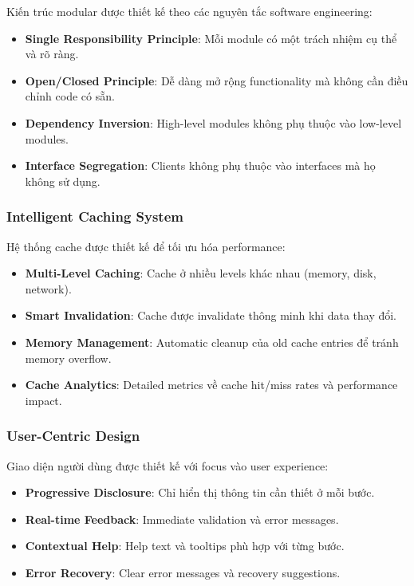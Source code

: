 Kiến trúc modular được thiết kế theo các nguyên tắc software engineering:

\begin{itemize}
    \item \textbf{Single Responsibility Principle}: Mỗi module có một trách nhiệm cụ thể và rõ ràng.
    \item \textbf{Open/Closed Principle}: Dễ dàng mở rộng functionality mà không cần điều chỉnh code có sẵn.
    \item \textbf{Dependency Inversion}: High-level modules không phụ thuộc vào low-level modules.
    \item \textbf{Interface Segregation}: Clients không phụ thuộc vào interfaces mà họ không sử dụng.
\end{itemize}

\subsubsection{Intelligent Caching System}

Hệ thống cache được thiết kế để tối ưu hóa performance:

\begin{itemize}
    \item \textbf{Multi-Level Caching}: Cache ở nhiều levels khác nhau (memory, disk, network).
    \item \textbf{Smart Invalidation}: Cache được invalidate thông minh khi data thay đổi.
    \item \textbf{Memory Management}: Automatic cleanup của old cache entries để tránh memory overflow.
    \item \textbf{Cache Analytics}: Detailed metrics về cache hit/miss rates và performance impact.
\end{itemize}

\subsubsection{User-Centric Design}

Giao diện người dùng được thiết kế với focus vào user experience:

\begin{itemize}
    \item \textbf{Progressive Disclosure}: Chỉ hiển thị thông tin cần thiết ở mỗi bước.
    \item \textbf{Real-time Feedback}: Immediate validation và error messages.
    \item \textbf{Contextual Help}: Help text và tooltips phù hợp với từng bước.
    \item \textbf{Error Recovery}: Clear error messages và recovery suggestions.
\end{itemize}

